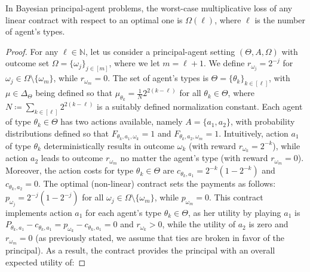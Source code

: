 \begin{theorem}\label{thm:linear_lower_bound}
	In Bayesian principal-agent problems, the worst-case multiplicative loss of any linear contract with respect to an optimal one is $\Omega(\ell)$, where $\ell$ is the number of agent's types.
\end{theorem}

\begin{proof}
	For any $\ell \in \mathbb{N}$, let us consider a principal-agent setting $(\Theta, A, \Omega)$ with outcome set $\Omega = \{ \omega_j \}_{j \in [m]}$, where we let $m = \ell +1$.
	We define $r_{\omega_j} = 2^{-j}$ for $\omega_j \in \Omega \setminus \{ \omega_m \}$, while $r_{\omega_m} = 0$.
	The set of agent's types is $\Theta = \{ \theta_k \}_{k \in [\ell]}$, with $\mu \in \Delta_\Theta$ being defined so that $\mu_{\theta_k} = \frac{1}{N} 2^{2(k - \ell)}$ for all $\theta_k \in \Theta$, where $N \coloneqq \sum_{k \in [\ell]} 2^{2(k - \ell)}$ is a suitably defined normalization constant.
	Each agent of type $\theta_k \in \Theta$ has two actions available, namely $A = \{ a_1, a_2 \}$, with probability distributions defined so that $F_{\theta_k,a_1,\omega_k} = 1$ and $F_{\theta_k,a_2,\omega_m} = 1$.
	Intuitively, action $a_1$ of type $\theta_k$ deterministically results in outcome $\omega_k$ (with reward $r_{\omega_k} = 2^{-k}$), while action $a_2$ leads to outcome $r_{\omega_m}$ no matter the agent's type (with reward $r_{\omega_m} = 0$).
	Moreover, the action costs for type $\theta_k \in \Theta$ are $c_{\theta_k,a_1} = 2^{-k} \left(  1- 2^{-k}  \right)$ and $c_{\theta_k,a_2}= 0$.
	The optimal (non-linear) contract sets the payments as follows: $p_{\omega_j} = 2^{-j} \left( 1-2^{-j} \right)$ for all $\omega_j \in \Omega \setminus \{ \omega_m \}$, while $p_{\omega_m} = 0$.
	This contract implements action $a_1$ for each agent's type $\theta_k \in \Theta$, as her utility by playing $a_1$ is $P_{\theta_k, a_1} - c_{\theta_k, a_1} = p_{\omega_k} - c_{\theta_k,a_1} = 0$ and $r_{\omega_k} > 0$, while the utility of $a_2$ is zero and $r_{\omega_m} = 0$ (as previously stated, we assume that ties are broken in favor of the principal).
	As a result, the contract provides the principal with an overall expected utility of:

\end{proof}
